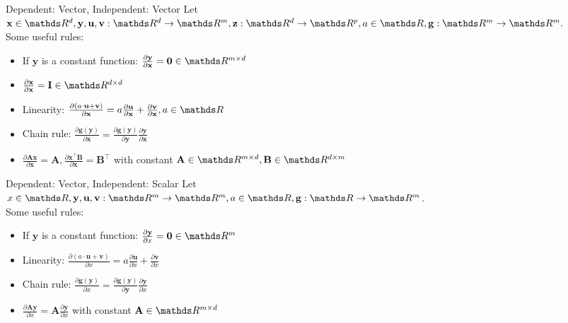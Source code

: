 \documentclass[11pt,compress,t,notes=noshow, xcolor=table]{beamer}
\begin{document}
\begin{vbframe}{Dependent: Vector, Independent: Vector}
Let $\mathbf{x} \in \R^d, \mathbf{y},  \mathbf{u}, \mathbf{v}: \R^d \rightarrow \R^m,\mathbf{z}:\R^d\rightarrow\R^p, a \in \R, \mathbf{g}:\R^m\rightarrow  \R^m.$ \\
\medskip
Some useful rules:
\begin{itemize}
    \item If $\mathbf{y}$ is a constant function: $\frac{\partial \mathbf{y}}{\partial \mathbf{x}} = \mathbf{0} \in \R^{m \times d}$
    \item $\frac{\partial \mathbf{x}}{\partial \mathbf{x}} = \mathbf{I} \in \R^{d \times d}$
    \item Linearity: $\frac{\partial (a\cdot \mathbf{u} + \mathbf{v})}{\partial \mathbf{x}} = a\frac{\partial \mathbf{u}}{\partial \mathbf{x}} + \frac{\partial \mathbf{v}}{\partial \mathbf{x}}, a \in \R $
    \item Chain rule: $\frac{\partial \mathbf{g}(\mathbf{y})}{\partial \mathbf{x}} = \frac{\partial \mathbf{g}(\mathbf{y})}{\partial \mathbf{y}}\frac{\partial \mathbf{y}}{\partial \mathbf{x}}$
    \item $\frac{\partial \mathbf{A}\mathbf{x}}{\partial\mathbf{x}} =  \mathbf{A}, \frac{\partial \mathbf{x}^\top\mathbf{B}}{\partial\mathbf{x}} = \mathbf{B}^\top$ with constant $\mathbf{A} \in \R^{m\times d}, \mathbf{B} \in \R^{d \times m}$
 
  
\end{itemize}
\end{vbframe}

\begin{vbframe}{Dependent: Vector, Independent: Scalar}
Let  $x \in \R, \mathbf{y},  \mathbf{u}, \mathbf{v}: \R^m \rightarrow \R^m, a \in \R, \mathbf{g}:\R\rightarrow  \R^m$. \\
\medskip
Some useful rules:
\begin{itemize}
    \item If $\mathbf{y}$ is a constant function: $\frac{\partial \mathbf{y}}{\partial x} = \mathbf{0} \in \R^{m}$
    \item Linearity: $\frac{\partial (a\cdot \mathbf{u} + \mathbf{v})}{\partial x} = a\frac{\partial \mathbf{u}}{\partial x} + \frac{\partial \mathbf{v}}{\partial x} $
    \item Chain rule: $\frac{\partial \mathbf{g}(\mathbf{y})}{\partial x} = \frac{\partial \mathbf{g}(\mathbf{y})}{\partial \mathbf{y}}\frac{\partial \mathbf{y}}{\partial x}$
    \item $\frac{\partial\mathbf{A}\mathbf{y}}{\partial x} = \mathbf{A}\frac{\partial\mathbf{y}}{\partial x}$ with constant $\mathbf{A} \in \R^{m\times d}$
\end{itemize}
\end{vbframe}
\end{document}
